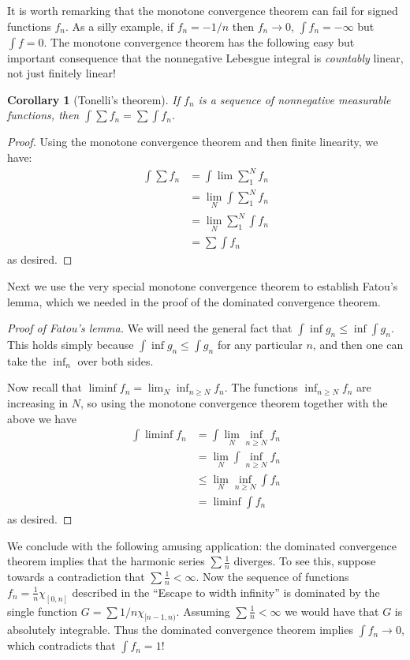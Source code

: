 \documentclass[11pt,oneside]{amsbook}
\theoremstyle{definition}
\theoremstyle{plain}
\newtheorem{cor}[thm]{Corollary}
\theoremstyle{definition}
\theoremstyle{remark}
\numberwithin{equation}{section}
\numberwithin{figure}{section}
\begin{document}
It is worth remarking that the monotone convergence theorem can fail for signed functions $f_n$. As a silly example, if $f_n=-1/n$ then $f_n\to0$, $\int f_n=-\infty$ but $\int f=0$. The monotone convergence theorem has the following easy but important consequence that the nonnegative Lebesgue integral is \emph{countably} linear, not just finitely linear!

\begin{cor}[Tonelli's theorem]
  If $f_n$ is a sequence of nonnegative measurable functions, then $\int\sum f_n=\sum\int f_n$.
\end{cor}

\begin{proof}
  Using the monotone convergence theorem and then finite linearity, we have:
  \begin{align*}
    \int\sum f_n&=\int\lim\sum_1^Nf_n\\
                &=\lim_N\int\sum_1^Nf_n\\
                &=\lim_N\sum_1^N\int f_n\\
                &=\sum\int f_n
  \end{align*}
  as desired.
\end{proof}

Next we use the very special monotone convergence theorem to establish Fatou's lemma, which we needed in the proof of the dominated convergence theorem.

\begin{proof}[Proof of Fatou's lemma]
  We will need the general fact that $\int\inf g_n\leq\inf\int g_n$. This holds simply because $\int\inf g_n\leq\int g_n$ for any particular $n$, and then one can take the $\inf_n$ over both sides.

  Now recall that $\liminf f_n=\lim_N\inf_{n\geq N}f_n$. The functions $\inf_{n\geq N}f_n$ are increasing in $N$, so using the monotone convergence theorem together with the above we have
  \begin{align*}
    \int\liminf f_n&=\int\lim_N\inf_{n\geq N} f_n\\
                    &=\lim_N\int\inf_{n\geq N}f_n\\
                    &\leq\lim_N\inf_{n\geq N}\int f_n\\
                    &=\liminf\int f_n
  \end{align*}
  as desired.
\end{proof}

We conclude with the following amusing application: the dominated convergence theorem implies that the harmonic series $\sum\frac1n$ diverges. To see this, suppose towards a contradiction that $\sum\frac1n<\infty$. Now the sequence of functions $f_n=\frac1n\chi_{[0,n]}$ described in the ``Escape to width infinity'' is dominated by the single function $G=\sum 1/n\chi_{[n-1,n)}$. Assuming $\sum\frac1n<\infty$ we would have that $G$ is absolutely integrable. Thus the dominated convergence theorem implies $\int f_n\to 0$, which contradicts that $\int f_n=1$!
\end{document}
